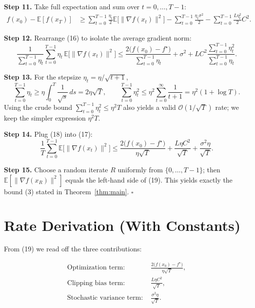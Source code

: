 \documentclass{article}
\newcommand{\E}{\mathbb{E}}
\begin{document}
\noindent\textbf{Step 11.} Take full expectation and sum over $t=0,\dots,T-1$:
\[
\begin{aligned}
f(x_0)-\E[f(x_T)]
&\ge \sum_{t=0}^{T-1}\frac{\eta_t}{2}\E\!\bigl[\|\nabla f(x_t)\|^{2}\bigr]
   -\sum_{t=0}^{T-1}\frac{\eta_t\sigma^{2}}{2}
   -\sum_{t=0}^{T-1}\frac{L\eta_t^{2}}{2}C^{2}.
\end{aligned}
\tag{16}
\]

\noindent\textbf{Step 12.} Rearrange (16) to isolate the average gradient norm:
\[
\frac{1}{\sum_{t=0}^{T-1}\eta_t}
\sum_{t=0}^{T-1}\eta_t\,\E\!\bigl[\|\nabla f(x_t)\|^{2}\bigr]
\le \frac{2\bigl(f(x_0)-f^{\star}\bigr)}{\sum_{t=0}^{T-1}\eta_t}
   +\sigma^{2}
   +L C^{2}\frac{\sum_{t=0}^{T-1}\eta_t^{2}}{\sum_{t=0}^{T-1}\eta_t}.
\tag{17}
\]

\noindent\textbf{Step 13.} For the stepsize $\eta_t=\eta/\sqrt{t+1}$,
\[
\sum_{t=0}^{T-1}\eta_t \ge \eta\int_{0}^{T}\frac{1}{\sqrt{s}}\,ds
      =2\eta\sqrt{T},
\qquad
\sum_{t=0}^{T-1}\eta_t^{2}\le \eta^{2}\sum_{t=0}^{\infty}\frac{1}{t+1}
      =\eta^{2}(1+\log T).
\tag{18}
\]
Using the crude bound $\sum_{t=0}^{T-1}\eta_t^{2}\le \eta^{2}T$ also yields a valid $\mathcal O(1/\sqrt{T})$ rate; we keep the simpler expression $\eta^{2}T$.

\noindent\textbf{Step 14.} Plug (18) into (17):
\[
\frac{1}{T}\sum_{t=0}^{T-1}\E\!\bigl[\|\nabla f(x_t)\|^{2}\bigr]
\le
\frac{2\bigl(f(x_0)-f^{\star}\bigr)}{\eta\sqrt{T}}
+\frac{L\eta C^{2}}{\sqrt{T}}
+\frac{\sigma^{2}\eta}{\sqrt{T}}.
\tag{19}
\]

\noindent\textbf{Step 15.} Choose a random iterate $R$ uniformly from $\{0,\dots,T-1\}$; then $\E[\|\nabla f(x_R)\|^{2}]$ equals the left‑hand side of (19). This yields exactly the bound (3) stated in Theorem~\ref{thm:main}. \hfill $\square$

\section*{Rate Derivation (With Constants)}
From (19) we read off the three contributions:

\[
\begin{aligned}
\text{Optimization term: }& \frac{2\bigl(f(x_0)-f^{\star}\bigr)}{\eta\sqrt{T}},\\[2mm]
\text{Clipping bias term: }& \frac{L\eta C^{2}}{\sqrt{T}},\\[2mm]
\text{Stochastic variance term: }& \frac{\sigma^{2}\eta}{\sqrt{T}}.
\end{aligned}
\]
\end{document}
